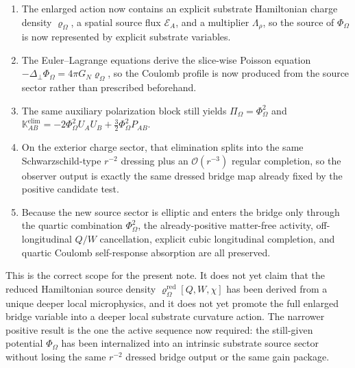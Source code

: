 \documentclass[11pt]{article}
\newcommand{\ProjSub}{P}
\newcommand{\LapPerp}{\Delta_\perp}
\newcommand{\FlowPot}{\Phi_\Omega}
\newcommand{\BalanceField}{\Pi_\Omega}
\newcommand{\SourceDensity}{\varrho_\Omega}
\newcommand{\SourceDensityRed}{\varrho_\Omega^{\mathrm{red}}}
\newcommand{\SourceMult}{\Lambda_\rho}
\newcommand{\SourceFlux}{\mathcal E}
\newcommand{\AuxPol}{\mathbb K}
\begin{document}
\begin{enumerate}
    \item The enlarged action now contains an explicit substrate Hamiltonian charge density \(\SourceDensity\), a spatial source flux \(\SourceFlux_A\), and a multiplier \(\SourceMult\), so the source of \(\FlowPot\) is now represented by explicit substrate variables.
    \item The Euler--Lagrange equations derive the slice-wise Poisson equation \(-\LapPerp\FlowPot=4\pi G_N\SourceDensity\), so the Coulomb profile is now produced from the source sector rather than prescribed beforehand.
    \item The same auxiliary polarization block still yields \(\BalanceField=\FlowPot^2\) and \(\AuxPol_{AB}^{\mathrm{elim}}=-2\FlowPot^2U_AU_B+\tfrac32\FlowPot^2\ProjSub_{AB}\).
    \item On the exterior charge sector, that elimination splits into the same Schwarzschild-type \(r^{-2}\) dressing plus an \(\mathcal O(r^{-3})\) regular completion, so the observer output is exactly the same dressed bridge map already fixed by the positive candidate test.
    \item Because the new source sector is elliptic and enters the bridge only through the quartic combination \(\FlowPot^2\), the already-positive matter-free activity, off-longitudinal \(Q/W\) cancellation, explicit cubic longitudinal completion, and quartic Coulomb self-response absorption are all preserved.
\end{enumerate}

This is the correct scope for the present note. It does not yet claim that the reduced Hamiltonian source density \(\SourceDensityRed[Q,W,\chi]\) has been derived from a unique deeper local microphysics, and it does not yet promote the full enlarged bridge variable into a deeper local substrate curvature action. The narrower positive result is the one the active sequence now required: the still-given potential \(\FlowPot\) has been internalized into an intrinsic substrate source sector without losing the same \(r^{-2}\) dressed bridge output or the same gain package.
\end{document}

